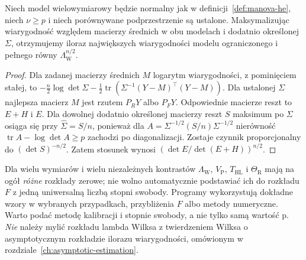 \begin{twierdzenie}\label{thm:wilks-lrt-manova}
Niech model wielowymiarowy będzie normalny jak w definicji~\ref{def:manova-he}, niech $\nu\ge p$ i niech porównywane podprzestrzenie są ustalone. Maksymalizując wiarygodność względem macierzy średnich w obu modelach i dodatnio określonej $\Sigma$, otrzymujemy iloraz największych wiarygodności modelu ograniczonego i pełnego równy $\Lambda_{\mathrm W}^{n/2}$.
\end{twierdzenie}
\begin{proof}
Dla zadanej macierzy średnich $M$ logarytm wiarygodności, z pominięciem stałej, to $-\frac n2\log\det\Sigma-\frac12\operatorname{tr}(\Sigma^{-1}(Y-M)^\top(Y-M))$. Dla ustalonej $\Sigma$ najlepsza macierz $M$ jest rzutem $P_RY$ albo $P_FY$. Odpowiednie macierze reszt to $E+H$ i $E$. Dla dowolnej dodatnio określonej macierzy reszt $S$ maksimum po $\Sigma$ osiąga się przy $\widehat\Sigma=S/n$, ponieważ dla $A=\Sigma^{-1/2}(S/n)\Sigma^{-1/2}$ nierówność $\operatorname{tr}A-\log\det A\ge p$ zachodzi po diagonalizacji. Zostaje czynnik proporcjonalny do $(\det S)^{-n/2}$. Zatem stosunek wynosi $(\det E/\det(E+H))^{n/2}$.
\end{proof}

\begin{uwaga}
Dla wielu wymiarów i wielu niezależnych kontrastów $\Lambda_{\mathrm W}$, $V_{\mathrm P}$, $T_{\mathrm{HL}}$ i $\Theta_{\mathrm R}$ mają na ogół \emph{różne} rozkłady zerowe; nie wolno automatycznie podstawiać ich do rozkładu $F$ z jedną uniwersalną liczbą stopni swobody. Programy wykorzystują dokładne wzory w wybranych przypadkach, przybliżenia $F$ albo metody numeryczne. Warto podać metodę kalibracji i stopnie swobody, a nie tylko samą wartość p. \emph{Nie} należy mylić rozkładu lambda Wilksa z twierdzeniem Wilksa o asymptotycznym rozkładzie ilorazu wiarygodności, omówionym w rozdziale~\ref{ch:asymptotic-estimation}.
\end{uwaga}

